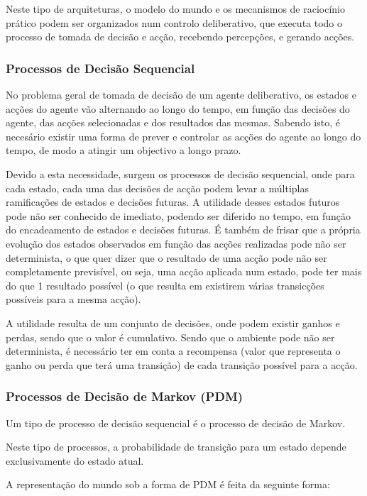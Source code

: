 \documentclass[a4paper,12pt]{article}
\begin{document}
Neste tipo de arquiteturas, o modelo do mundo e os mecanismos de raciocínio prático podem ser organizados num controlo deliberativo, que executa todo o processo de tomada de decisão e acção, recebendo percepções, e gerando acções.

\subsubsection{Processos de Decisão Sequencial} \label{processos_de_decisao_sequencial}
No problema geral de tomada de decisão de um agente deliberativo, os estados e acções do agente vão alternando ao longo do tempo, em função das decisões do agente, das acções selecionadas e dos resultados das mesmas. Sabendo isto, é necesário existir uma forma de prever e controlar as acções do agente ao longo do tempo, de modo a atingir um objectivo a longo prazo.

Devido a esta necessidade, surgem os processos de decisão sequencial, onde para cada estado, cada uma das decisões de acção podem levar a múltiplas ramificações de estados e decisões futuras.
A utilidade desses estados futuros pode não ser conhecido de imediato, podendo ser diferido no tempo, em função do encadeamento de estados e decisões futuras. É também de frisar que a própria evolução dos estados observados em função das acções realizadas pode não ser determinista, o que quer dizer que o resultado de uma acção pode não ser completamente previsível, ou seja, uma acção aplicada num estado, pode ter mais do que 1 resultado possível (o que resulta em existirem várias transicções possíveis para a mesma acção).

A utilidade resulta de um conjunto de decisões, onde podem existir ganhos e perdas, sendo que o valor é cumulativo. Sendo que o ambiente pode não ser determinista, é necessário ter em conta a recompensa (valor que representa o ganho ou perda que terá uma transição) de cada transição possível para a acção.

\subsubsection{Processos de Decisão de Markov (PDM)} \label{processos_de_decisao_de_markov}
Um tipo de processo de decisão sequencial é o processo de decisão de Markov.

Neste tipo de processos, a probabilidade de transição para um estado depende exclusivamente do estado atual.

A representação do mundo sob a forma de PDM é feita da seguinte forma:
\end{document}
